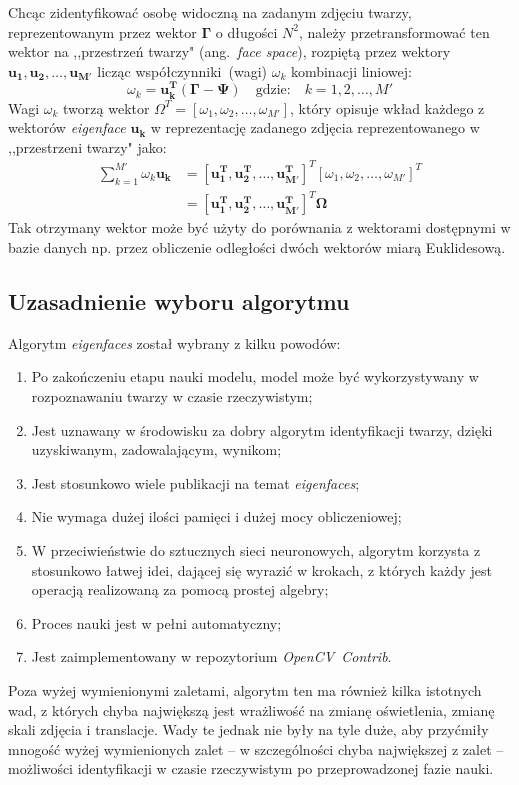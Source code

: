 \documentclass[a4paper,titlepage]{article}
\theoremstyle{break}
\numberwithin{equation}{subsection}
\begin{document}
Chcąc zidentyfikować osobę widoczną na zadanym zdjęciu twarzy, reprezentowanym przez wektor $\bm\Gamma$ o długości $N^2$, należy przetransformować ten wektor na ,,przestrzeń twarzy" (ang.~\emph{face space}), rozpiętą przez wektory~$\bm{u_1},\bm{u_2},\dotsc,\bm{u_{M'}}$ licząc współczynniki~(wagi) $\omega_k$ kombinacji liniowej:
\begin{equation}
	\omega_k=\bm{u_k^T}(\bm{\Gamma}-\bm{\Psi})\quad\text{gdzie:}\quad k=1,2,\dotsc,M'
\end{equation}
Wagi $\omega_k$ tworzą wektor $\Omega^T=[\omega_1,\omega_2,\dotsc,\omega_{M'}]$, który opisuje wkład każdego z wektorów \emph{eigenface} $\bm{u_k}$ w reprezentację zadanego zdjęcia reprezentowanego w ,,przestrzeni twarzy" jako:
\begin{equation}
\begin{split}
	\sum\limits_{k=1}^{M'}\omega_k\bm{u_k}&=[\bm{u_1^T},\bm{u_2^T},\dotsc,\bm{u_{M'}^T}]^T[\omega_1,\omega_2,\dotsc,\omega_{M'}]^T\\&=[\bm{u_1^T},\bm{u_2^T},\dotsc,\bm{u_{M'}^T}]^T\bm{\Omega}
\end{split}
\end{equation}
Tak otrzymany wektor może być użyty do porównania z wektorami dostępnymi w bazie danych np. przez obliczenie odległości dwóch wektorów miarą Euklidesową.


\subsection{Uzasadnienie wyboru algorytmu}

Algorytm \emph{eigenfaces} został wybrany z kilku powodów:
\begin{enumerate}
	\item Po zakończeniu etapu nauki modelu, model może być wykorzystywany w rozpoznawaniu twarzy w czasie rzeczywistym;
	\item Jest uznawany w środowisku za dobry algorytm identyfikacji twarzy, dzięki uzyskiwanym, zadowalającym, wynikom;
	\item Jest stosunkowo wiele publikacji na temat \emph{eigenfaces};
	\item Nie wymaga dużej ilości pamięci i dużej mocy obliczeniowej;
	\item W przeciwieństwie do sztucznych sieci neuronowych, algorytm korzysta z stosunkowo łatwej idei, dającej się wyrazić w krokach, z których każdy jest operacją realizowaną za pomocą prostej algebry;
	\item Proces nauki jest w pełni automatyczny;
	\item Jest zaimplementowany w repozytorium \emph{OpenCV~Contrib}.
\end{enumerate}
Poza wyżej wymienionymi zaletami, algorytm ten ma również kilka istotnych wad, z których chyba największą jest wrażliwość na zmianę oświetlenia, zmianę skali zdjęcia i translacje. Wady te jednak nie były na tyle duże, aby przyćmiły mnogość wyżej wymienionych zalet -- w szczególności chyba największej z zalet -- możliwości identyfikacji w czasie rzeczywistym po przeprowadzonej fazie nauki.
\end{document}
